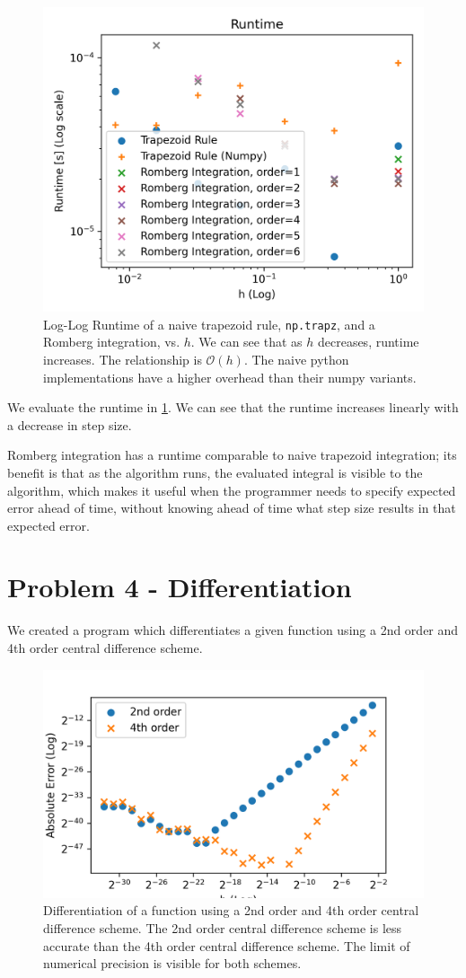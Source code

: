 \documentclass[10pt,letterpaper]{article}
\begin{document}
    \begin{figure}
        \centering
        \includegraphics[width=0.7\linewidth]{../plots/integration_runtime.png}
        \caption{Log-Log Runtime of a naive trapezoid rule, \texttt{np.trapz}, and a Romberg integration, vs. $h$. We can see that as $h$ decreases, runtime increases. The relationship is $\mathcal{O}(h)$. The naive python implementations have a higher overhead than their numpy variants.}
        \label{fig:integration_runtime}
    \end{figure}

    We evaluate the runtime in \cref{fig:integration_runtime}. We can see that the runtime increases linearly with a decrease in step size.

    Romberg integration has a runtime comparable to naive trapezoid integration; its benefit is that as the algorithm runs, the evaluated integral is visible to the algorithm, which makes it useful when the programmer needs to specify expected error ahead of time, without knowing ahead of time what step size results in that expected error.
    \section{Problem 4 - Differentiation}
    We created a program which differentiates a given function using a 2nd order and 4th order central difference scheme.

    \begin{figure}
        \centering
        \includegraphics[width=0.7\linewidth]{../plots/derivs.png}
        \caption{Differentiation of a function using a 2nd order and 4th order central difference scheme. The 2nd order central difference scheme is less accurate than the 4th order central difference scheme. The limit of numerical precision is visible for both schemes.}
        \label{fig:diff_err}
    \end{figure}
\end{document}
